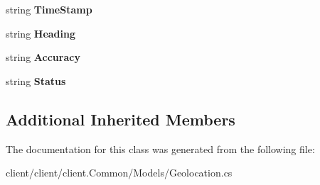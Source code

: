 \begin{DoxyCompactItemize}
\item 
\hypertarget{classClient_1_1Common_1_1Models_1_1Geolocation_a3b20a3c7eb700502c6362c44f25df4f5}{string {\bfseries Time\-Stamp}}\label{classClient_1_1Common_1_1Models_1_1Geolocation_a3b20a3c7eb700502c6362c44f25df4f5}

\item 
\hypertarget{classClient_1_1Common_1_1Models_1_1Geolocation_a61cd544e271fff1bd80e2dd30159c360}{string {\bfseries Heading}}\label{classClient_1_1Common_1_1Models_1_1Geolocation_a61cd544e271fff1bd80e2dd30159c360}

\item 
\hypertarget{classClient_1_1Common_1_1Models_1_1Geolocation_aac245b5fd2c8fbc0c67ff14f46aec4b9}{string {\bfseries Accuracy}}\label{classClient_1_1Common_1_1Models_1_1Geolocation_aac245b5fd2c8fbc0c67ff14f46aec4b9}

\item 
\hypertarget{classClient_1_1Common_1_1Models_1_1Geolocation_ab0d1261cf734929820b22f0d0e8dee59}{string {\bfseries Status}}\label{classClient_1_1Common_1_1Models_1_1Geolocation_ab0d1261cf734929820b22f0d0e8dee59}

\end{DoxyCompactItemize}
\subsection*{Additional Inherited Members}


The documentation for this class was generated from the following file\-:\begin{DoxyCompactItemize}
\item 
client/client/client.\-Common/\-Models/Geolocation.\-cs\end{DoxyCompactItemize}
